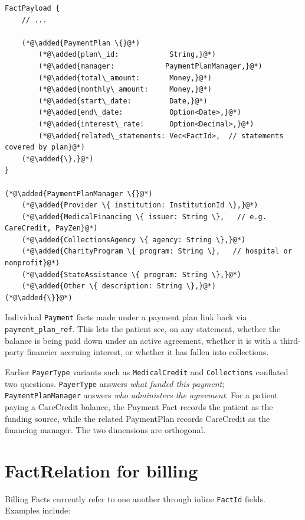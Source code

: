 \documentclass[11pt]{article}
\newcommand{\added}[1]{\textcolor{accentblue}{#1}}
\begin{document}
\begin{lstlisting}
FactPayload {
    // ...

    (*@\added{PaymentPlan \{}@*)
        (*@\added{plan\_id:            String,}@*)
        (*@\added{manager:            PaymentPlanManager,}@*)
        (*@\added{total\_amount:       Money,}@*)
        (*@\added{monthly\_amount:     Money,}@*)
        (*@\added{start\_date:         Date,}@*)
        (*@\added{end\_date:           Option<Date>,}@*)
        (*@\added{interest\_rate:      Option<Decimal>,}@*)
        (*@\added{related\_statements: Vec<FactId>,  // statements covered by plan}@*)
    (*@\added{\},}@*)
}

(*@\added{PaymentPlanManager \{}@*)
    (*@\added{Provider \{ institution: InstitutionId \},}@*)
    (*@\added{MedicalFinancing \{ issuer: String \},   // e.g. CareCredit, PayZen}@*)
    (*@\added{CollectionsAgency \{ agency: String \},}@*)
    (*@\added{CharityProgram \{ program: String \},   // hospital or nonprofit}@*)
    (*@\added{StateAssistance \{ program: String \},}@*)
    (*@\added{Other \{ description: String \},}@*)
(*@\added{\}}@*)
\end{lstlisting}

Individual \texttt{Payment} facts made under a payment plan link back
via \texttt{payment\_plan\_ref}. This lets the patient see, on any
statement, whether the balance is being paid down under an active
agreement, whether it is with a third-party financier accruing interest,
or whether it has fallen into collections.

Earlier \texttt{PayerType} variants such as \texttt{MedicalCredit} and
\texttt{Collections} conflated two questions. \texttt{PayerType} answers
\emph{what funded this payment}; \texttt{PaymentPlanManager} answers
\emph{who administers the agreement}. For a patient paying a CareCredit
balance, the Payment Fact records the patient as the funding source, while the
related PaymentPlan records CareCredit as the financing manager. The two
dimensions are orthogonal.

\section{FactRelation for billing}
\label{sec:fact-relation}

Billing Facts currently refer to one another through inline \texttt{FactId}
fields. Examples include:
\end{document}
